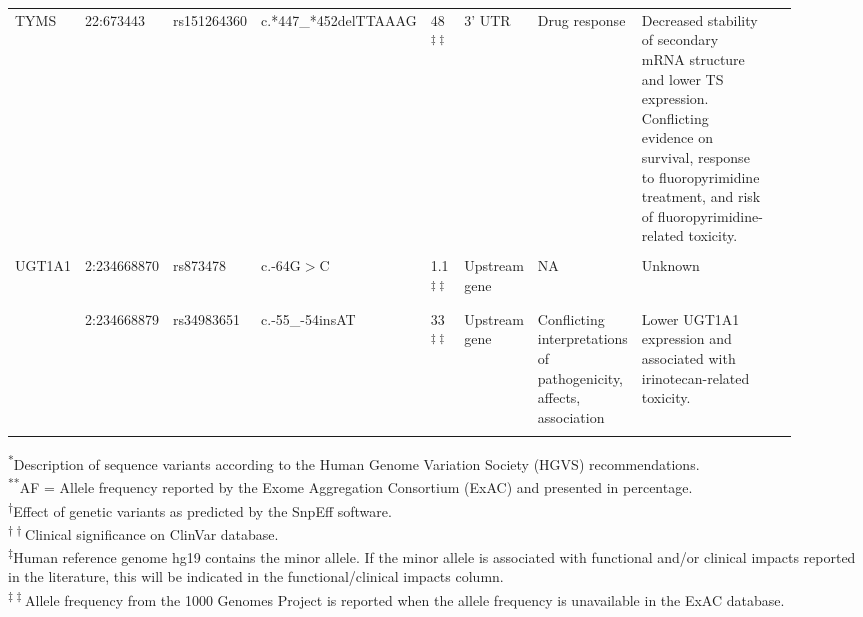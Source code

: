 \begin{landscape}
\begin{longtable}{p{0.07\linewidth}|p{0.09\linewidth}p{0.085\linewidth}p{0.14\linewidth}p{0.05\linewidth}p{0.065\linewidth}p{0.11\linewidth}p{0.25\linewidth}p{0.05\linewidth}}
	\hline
	TYMS & 22:673443 & rs151264360 & \footnotesize{c.*447\_*452delTTAAAG} & 48\textsuperscript{$\ddagger\ddagger$} & 3' UTR & Drug response & Decreased stability of secondary mRNA structure and lower TS expression. Conflicting evidence on survival, response to fluoropyrimidine treatment, and risk of fluoropyrimidine-related toxicity. & \cite{Gusella2006, Mandola2004, Graziano2008, Afzal2011, Dotor2006, Stoehlmacher2004}
	\\
	\\
	\hline
	UGT1A1 & 2:234668870 & rs873478 & c.-64G$>$C & 1.1\textsuperscript{$\ddagger\ddagger$} & Upstream gene & NA & Unknown & \cite{Cheli2015, Yea2008, Zhang2012}
	\\
	\\
	& 2:234668879 & rs34983651 & c.-55\_-54insAT & 33\textsuperscript{$\ddagger\ddagger$} & Upstream gene & Conflicting \mbox{interpretations} of \mbox{pathogenicity}, affects, \mbox{association} & Lower UGT1A1 expression and associated with irinotecan-related toxicity. & \cite{Toffoli2006, Rouits2008, McLeod2010, Marcuello2004, Ando2000, Innocenti2004, Glimelius2011, Ruzzo2008, DeJong2006, Kweekel2008}
	\\
	\\
	\hline
\end{longtable}

\noindent\textsuperscript{*}Description of sequence variants according to the Human Genome Variation Society (HGVS) recommendations.
\\
\textsuperscript{**}AF = Allele frequency reported by the Exome Aggregation Consortium (ExAC) and presented in percentage.
\\
\textsuperscript{$\dagger$}Effect of genetic variants as predicted by the SnpEff software.
\\
\textsuperscript{$\dagger\dagger$}Clinical significance on ClinVar database.
\\
\textsuperscript{$\ddagger$}Human reference genome hg19 contains the minor allele. If the minor allele is associated with functional and/or clinical impacts reported in the literature, this will be indicated in the functional/clinical impacts column.
\\
\textsuperscript{$\ddagger\ddagger$}Allele frequency from the 1000 Genomes Project is reported when the allele frequency is unavailable in the ExAC database.
\\

\end{landscape}

